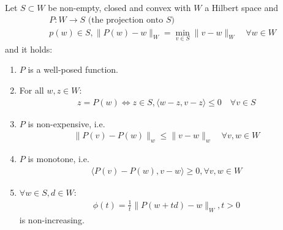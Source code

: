 \begin{lemma}
	Let $S \subset W$ be non-empty, closed and convex with $W$ a Hilbert space and 
	\begin{align*}
		&P: W \rightarrow S \text{ (the projection onto $S$) }\\
		&p(w) \in S, \|P(w) - w \|_W = \min_{v \in S} \|v - w\|_W \quad \forall w \in W
	\end{align*}
	and it holds:
	\begin{enumerate}
		\item $P$ is a well-posed function.
		\item For all $w, z \in W:$
			\begin{align*}
				z = P(w) \Leftrightarrow z \in S, \langle w - z, v - z \rangle \le 0 \quad \forall v \in S
			\end{align*}
		\item $P$ is non-expensive, i.e.
			\begin{align*}
				\|P(v) - P(w)\|_w \le \|v - w\|_w \quad \forall v, w \in W
			\end{align*}
		\item $P$ is monotone, i.e.
			\begin{align*}
				\langle P(v) - P(w), v - w \rangle \ge 0 , \forall v, w \in W
			\end{align*}
		\item $\forall w \in S, d \in W$:
			\begin{align*}
				\phi(t) = \frac{1}{t}\|P(w + td) - w\|_W, t > 0
			\end{align*}
			is non-increasing. 
	\end{enumerate}
\end{lemma}
